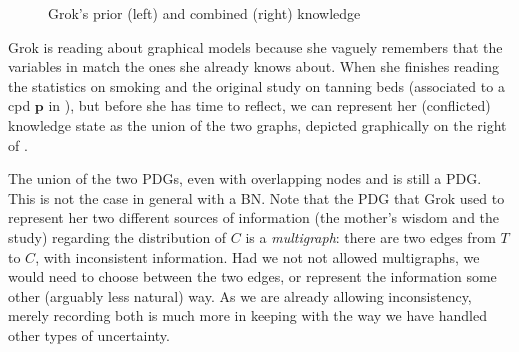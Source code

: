 \documentclass{article}
\newcommand\cmergearr[4]{
		\draw[arr,-] (#1) -- (#4) -- (#2);
		\draw[arr, shorten <=0] (#4) -- (#3);
	}
\newcommand\mergearr[3]{
		\coordinate (center-#1#2#3) at (barycentric cs:#1=1,#2=1,#3=1.2);
		\cmergearr{#1}{#2}{#3}{center-#1#2#3}
	}
\theoremstyle{plain}
\theoremstyle{definition}
\theoremstyle{remark}
\newcommand\mat[1]{\mathbf{#1}}
\numberwithin{equation}{section}
\begin{document}
\begin{example}
\begin{figure}
{
	}
	\caption{\small Grok's prior (left) and combined (right) knowledge}
	\label{fig:grok-combine}
\end{figure}

Grok is reading about graphical models because she vaguely remembers that the
variables in  match the ones she already knows about. When she
finishes reading the statistics on smoking and the original study on tanning
beds (associated to a cpd $\mat p$ in ), but before she has
time to reflect, we can represent her (conflicted) knowledge state as the union
of the two graphs, depicted graphically on the right of .  

The union of the two PDGs, even with overlapping nodes and is still a PDG. This
is not the case in general with a BN. Note that the PDG that Grok used to
represent her two different sources of information (the mother's wisdom and the
study) regarding the distribution of $C$ is a \emph{multigraph}: there are two
edges from $T$ to $C$, with inconsistent information. Had we not not allowed
multigraphs, we would need to choose between the two edges, or represent the
information some other (arguably less natural) way. As we are already allowing
inconsistency, merely recording both is much more in keeping with the way we
have handled other types of uncertainty. 
%		
\end{example}
\end{document}
